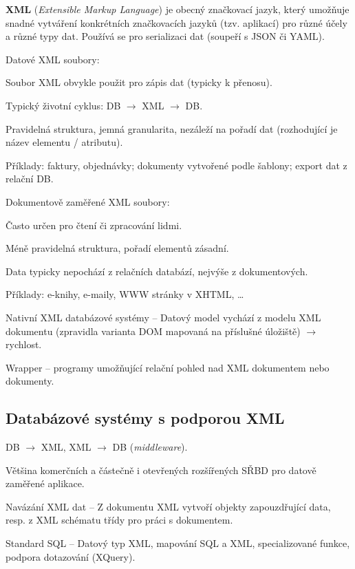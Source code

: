 \begin{compactitem}
    \item \textbf{XML} (\textit{Extensible Markup Language}) je obecný značkovací jazyk, který umožňuje snadné vytváření konkrétních značkovacích jazyků (tzv. aplikací) pro různé účely a různé typy dat. Používá se pro serializaci dat (soupeří s JSON či YAML).

    \item Datové XML soubory: \begin{compactitem}
        \item Soubor XML obvykle použit pro zápis dat (typicky k přenosu).
        \item Typický životní cyklus: DB $\rightarrow$ XML $\rightarrow$ DB.
        \item Pravidelná struktura, jemná granularita, nezáleží na pořadí dat (rozhodující je název elementu / atributu).
        \item Příklady: faktury, objednávky; dokumenty vytvořené podle šablony; export dat z relační DB.
    \end{compactitem}

    \item Dokumentově zaměřené XML soubory: \begin{compactitem}
        \item Často určen pro čtení či zpracování lidmi.
        \item Méně pravidelná struktura, pořadí elementů zásadní.
        \item Data typicky nepochází z relačních databází, nejvýše z dokumentových.
        \item Příklady: e-knihy, e-maily, WWW stránky v XHTML, \dots
    \end{compactitem}

    \item Nativní XML databázové systémy -- Datový model vychází z modelu XML dokumentu (zpravidla varianta DOM mapovaná na příslušné úložiště) $\rightarrow$ rychlost.

    \item Wrapper -- programy umožňující relační pohled nad XML dokumentem nebo dokumenty.
\end{compactitem}

\subsection{Databázové systémy s podporou XML}

\begin{compactitem}
    \item DB $\rightarrow$ XML, XML $\rightarrow$ DB (\textit{middleware}).
    \item Většina komerčních a částečně i otevřených rozšířených SŘBD pro datově zaměřené aplikace.
    \item Navázání XML dat -- Z dokumentu XML vytvoří objekty zapouzdřující data, resp. z XML schématu třídy pro práci s dokumentem.
    \item Standard SQL -- Datový typ XML, mapování SQL a XML, specializované funkce, podpora dotazování (XQuery).
\end{compactitem}

